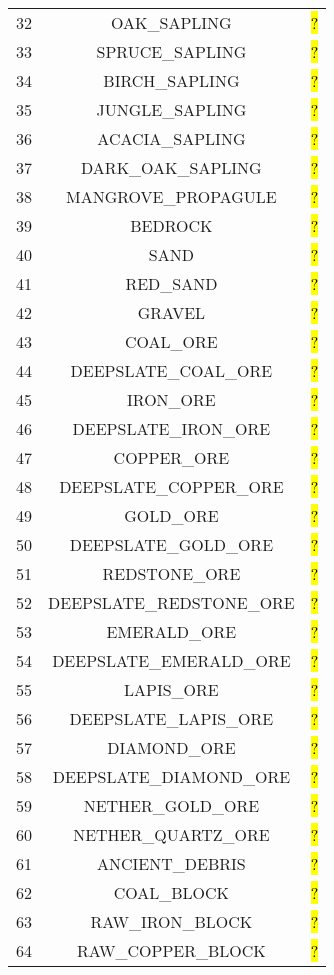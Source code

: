 \documentclass[11pt]{article}
\newcommand\myworries[1]{\sethlcolor{red}\hl{#1}}
\begin{document}
\begin{longtable}{ |c|c|c| }
	32 & OAK\_SAPLING & \myworries{?} \\
	33 & SPRUCE\_SAPLING & \myworries{?} \\
	34 & BIRCH\_SAPLING & \myworries{?} \\
	35 & JUNGLE\_SAPLING & \myworries{?} \\
	36 & ACACIA\_SAPLING & \myworries{?} \\
	37 & DARK\_OAK\_SAPLING & \myworries{?} \\
	38 & MANGROVE\_PROPAGULE & \myworries{?} \\
	39 & BEDROCK & \myworries{?} \\
	40 & SAND & \myworries{?} \\
	41 & RED\_SAND & \myworries{?} \\
	42 & GRAVEL & \myworries{?} \\
	43 & COAL\_ORE & \myworries{?} \\
	44 & DEEPSLATE\_COAL\_ORE & \myworries{?} \\
	45 & IRON\_ORE & \myworries{?} \\
	46 & DEEPSLATE\_IRON\_ORE & \myworries{?} \\
	47 & COPPER\_ORE & \myworries{?} \\
	48 & DEEPSLATE\_COPPER\_ORE & \myworries{?} \\
	49 & GOLD\_ORE & \myworries{?} \\
	50 & DEEPSLATE\_GOLD\_ORE & \myworries{?} \\
	51 & REDSTONE\_ORE & \myworries{?} \\
	52 & DEEPSLATE\_REDSTONE\_ORE & \myworries{?} \\
	53 & EMERALD\_ORE & \myworries{?} \\
	54 & DEEPSLATE\_EMERALD\_ORE & \myworries{?} \\
	55 & LAPIS\_ORE & \myworries{?} \\
	56 & DEEPSLATE\_LAPIS\_ORE & \myworries{?} \\
	57 & DIAMOND\_ORE & \myworries{?} \\
	58 & DEEPSLATE\_DIAMOND\_ORE & \myworries{?} \\
	59 & NETHER\_GOLD\_ORE & \myworries{?} \\
	60 & NETHER\_QUARTZ\_ORE & \myworries{?} \\
	61 & ANCIENT\_DEBRIS & \myworries{?} \\
	62 & COAL\_BLOCK & \myworries{?} \\
	63 & RAW\_IRON\_BLOCK & \myworries{?} \\
	64 & RAW\_COPPER\_BLOCK & \myworries{?} \\

\end{longtable}
\end{document}
